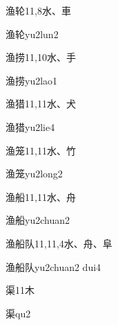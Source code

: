 \begin{Entry}{渔轮}{11,8}{⽔、⾞}
  \begin{Phonetics}{渔轮}{yu2lun2}
  \end{Phonetics}
\end{Entry}

\begin{Entry}{渔捞}{11,10}{⽔、⼿}
  \begin{Phonetics}{渔捞}{yu2lao1}
  \end{Phonetics}
\end{Entry}

\begin{Entry}{渔猎}{11,11}{⽔、⽝}
  \begin{Phonetics}{渔猎}{yu2lie4}
  \end{Phonetics}
\end{Entry}

\begin{Entry}{渔笼}{11,11}{⽔、⽵}
  \begin{Phonetics}{渔笼}{yu2long2}
  \end{Phonetics}
\end{Entry}

\begin{Entry}{渔船}{11,11}{⽔、⾈}
  \begin{Phonetics}{渔船}{yu2chuan2}
  \end{Phonetics}
\end{Entry}

\begin{Entry}{渔船队}{11,11,4}{⽔、⾈、⾩}
  \begin{Phonetics}{渔船队}{yu2chuan2 dui4}
  \end{Phonetics}
\end{Entry}

\begin{Entry}{渠}{11}{⽊}
  \begin{Phonetics}{渠}{qu2}
  \end{Phonetics}
\end{Entry}

